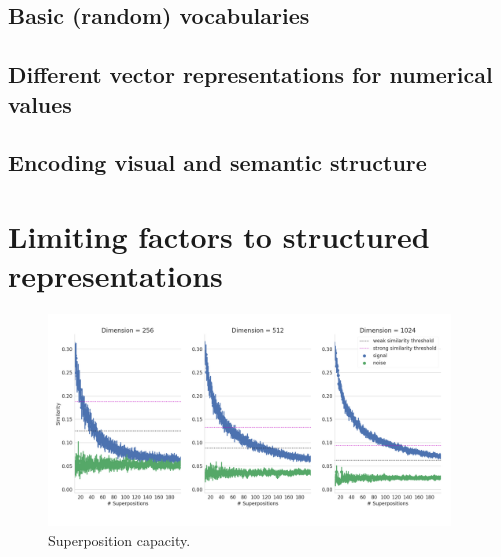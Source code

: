 \subsection{Basic (random) vocabularies}
\subsection{Different vector representations for numerical values}
\subsection{Encoding visual and semantic structure}

\section{Limiting factors to structured representations}
\begin{figure}[t]
	\centering
	\includegraphics[width=0.95\textwidth]{imgs/spa_superposition_capacity.png}
	\caption{Superposition capacity.}
	\label{fig:spa_superposition_capacity}
\end{figure}